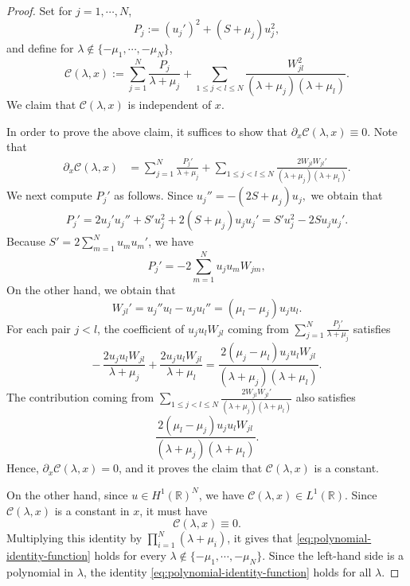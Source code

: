 \documentclass[11pt]{article}
\numberwithin{equation}{section}
\newcommand{\R}{{\mathbb{R}}}
\theoremstyle{definition}
\begin{document}
\begin{proof}
Set for \(j=1,\cdots,N\),
\[
P_j:=(u_j')^2+(S+\mu_j)u_j^2 ,
\]
and define for
\(\lambda\notin\{-\mu_1,\cdots,-\mu_N\}\),
\[
\mathcal C(\lambda,x)
:=
\sum_{j=1}^N
\frac{P_j}{\lambda+\mu_j}
+
\sum_{1\leq j<l\leq N}
\frac{W_{jl}^2}{(\lambda+\mu_j)(\lambda+\mu_l)} .
\]
We claim that \(\mathcal C(\lambda,x)\) is independent of \(x\).

In order to prove the above claim, it   suffices  to show that $	\partial_x \mathcal C(\lambda,x)\equiv 0$.  Note that
\[
\begin{split}
	\partial_x \mathcal C(\lambda,x)
	&=
	\sum_{j=1}^N
	\frac{P_j'}{\lambda+\mu_j}
	+
	\sum_{1\leq j<l\leq N}
	\frac{2W_{jl}W_{jl}'}{(\lambda+\mu_j)(\lambda+\mu_l)} .
\end{split}
\]
We next compute $P_j'$ as follows. Since
\(
u_j''=-(2S+\mu_j)u_j,
\)
we obtain that
\[
\begin{split}
	P_j'=
	2u_j'u_j''+S'u_j^2+2(S+\mu_j)u_ju_j'=
	S'u_j^2-2Su_ju_j' .
\end{split}
\]
Because \(S'=2\sum_{m=1}^N u_m u_m'\), we have
\[
P_j'
=
-2\sum_{m=1}^N u_j u_m W_{jm},
\]
On the other hand, we obtain that
\[
W_{jl}'
=
u_j''u_l-u_ju_l''
=
(\mu_l-\mu_j)u_ju_l .
\]
For each pair \(j<l\), the coefficient of $u_ju_lW_{jl}$ coming from $\sum_{j=1}^N
\frac{P_j'}{\lambda+\mu_j}
$ satisfies
\[
-\,\frac{2u_j u_l W_{jl}}{\lambda+\mu_j}
+
\frac{2u_j u_l W_{jl}}{\lambda+\mu_l}
=
\frac{2(\mu_j-\mu_l)u_j u_l W_{jl}}
{(\lambda+\mu_j)(\lambda+\mu_l)} .
\]
The contribution coming from $
\sum_{1\leq j<l\leq N}
\frac{2W_{jl}W_{jl}'}{(\lambda+\mu_j)(\lambda+\mu_l)}$ also satisfies
\[
\frac{2(\mu_l-\mu_j)u_j u_l W_{jl}}
{(\lambda+\mu_j)(\lambda+\mu_l)} .
\]
Hence,
$\partial_x \mathcal C(\lambda,x)=0$, and  it proves the claim that  $
\mathcal C(\lambda,x)$ is a constant.



On the other hand, since $u\in H^1(\R)^N$, we have $\mathcal C(\lambda,x)\in L^1(\R)$. Since $\mathcal C(\lambda,x)$ is a constant in \(x\), it must have
\[
\mathcal C(\lambda,x)\equiv0 .
\]
Multiplying this identity by
\(
\prod_{i=1}^N(\lambda+\mu_i)
\), it
gives  that \eqref{eq:polynomial-identity-function} holds for every
\(\lambda\notin\{-\mu_1,\cdots,-\mu_N\}\). Since the left-hand side is a
polynomial in \(\lambda\), the identity \eqref{eq:polynomial-identity-function} holds for all \(\lambda\).
\end{proof}
\end{document}
